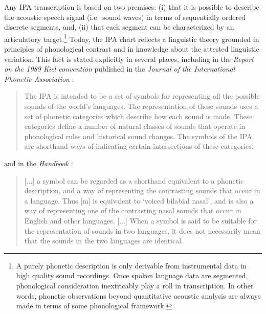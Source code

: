Any IPA transcription is based on two premises: (i) that it is possible to
describe the acoustic speech signal (i.e.\ sound waves) in terms of sequentially
ordered discrete segments, and, (ii) that each segment can be characterized by
an articulatory target.\footnote{A purely phonetic description is only derivable
from instrumental data in high quality sound recordings. Once spoken language
data are segmented, phonological consideration inextricably play a roll in
transcription. In other words, phonetic observations beyond quantitative
acoustic analysis are always made in terms of some phonological framework.}
Today, the IPA chart reflects a linguistic theory grounded in principles of
phonological contrast and in knowledge about the attested linguistic variation.
This fact is stated explicitly in several places, including in the
\textit{Report on the 1989 Kiel convention} published in the \textit{Journal of
the International Phonetic Association} \citep[67-68]{International1989report}:

\begin{quote}
The IPA is intended to be a set of symbols for representing all the possible 
sounds of the world's languages. The representation of these sounds uses a set 
of phonetic categories which describe how each sound is made. These categories 
define a number of natural classes of sounds that operate in phonological rules 
and historical sound changes. The symbols of the IPA are shorthand ways of 
indicating certain intersections of these categories.
\end{quote}

\noindent and in the \textit{Handbook} \citep[18]{IPA1999}: 

\begin{quote}
[...] a symbol can be regarded as a shorthand equivalent to a phonetic
description, and a way of representing the contrasting sounds that occur in a
language. Thus [m] is equivalent to `voiced bilabial nasal', and is also a way
of representing one of the contrasting nasal sounds that occur in English and
other languages. [...] When a symbol is said to be suitable for the
representation of sounds in two languages, it does not necessarily mean that the
sounds in the two languages are identical.
\end{quote}

